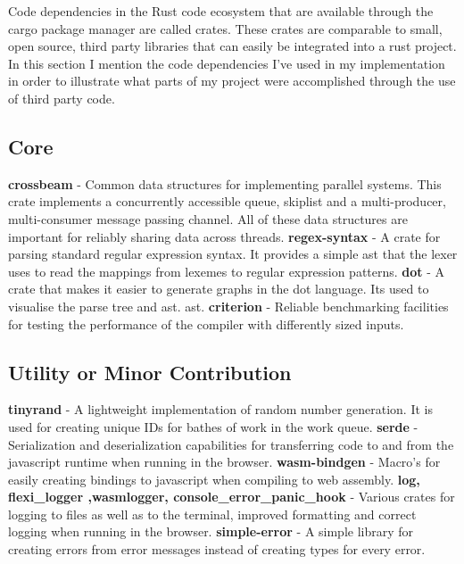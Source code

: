 Code dependencies in the Rust code ecosystem that are  available through the cargo package manager
are called crates. These crates are comparable to small, open source, third party libraries that can
easily be integrated into a rust project. In this section I mention the code dependencies I've used
in my implementation in order to illustrate what parts of my project were accomplished through the
use of third party code.

\subsection{Core}

\textbf{crossbeam} - Common data structures for implementing parallel systems.
This crate implements a concurrently accessible queue, skiplist and a
multi-producer, multi-consumer message passing channel. All of these data
structures are important for reliably sharing data across threads.
\newline\newline
\textbf{regex-syntax} - A crate for parsing standard regular expression syntax.
It provides a simple \gls{ast} that the lexer uses to read the mappings from
lexemes to regular expression patterns.
\newline\newline
\textbf{dot} - A crate that makes it easier to generate graphs in the dot
language. Its used to visualise the parse tree and \gls{ast}.
\gls{ast}.
\newline\newline
\textbf{criterion} - Reliable benchmarking facilities for testing the performance of the
compiler with differently sized inputs.

\subsection{Utility or Minor Contribution}
\textbf{tinyrand} - A lightweight implementation of random number
generation. It is used for creating unique IDs for bathes of work in the work
queue.
\textbf{serde} - Serialization and deserialization capabilities for transferring
code to and from the javascript runtime when running in the browser.
\newline\newline
\textbf{wasm-bindgen} - Macro's for easily creating bindings to javascript when
compiling to web assembly.
\newline\newline
\textbf{log, flexi\_logger ,wasm\-logger, console\_error\_panic\_hook} - Various
crates for logging to files as well as to the terminal, improved formatting and
correct logging when running in the browser.
\newline\newline
\textbf{simple-error} - A simple library for creating errors from error messages
instead of creating types for every error.

